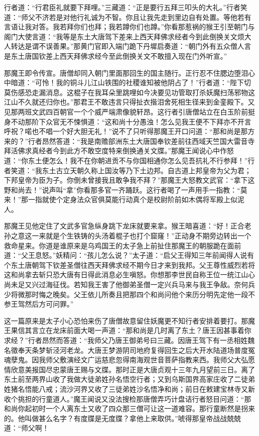 \documentclass[12pt,UTF8]{ctexbook}
\begin{document}
行者道：“行君臣礼就要下拜哩。”三藏道：“正是要行五拜三叩头的大礼。”行者笑道：“师父不济若是对他行礼诚为不智。你且让我先走到里边自有处置。等他若有言语让我对答。我若拜你们也拜；我若蹲你们也蹲。”你看那惹祸的猴王引至朝门与阁门大使言道：“我等是东土大唐驾下差来上西天拜佛求经者今到此倒换关文烦大人转达是谓不误善果。”那黄门官即入端门跪下丹墀启奏道：“朝门外有五众僧人言是东土唐国钦差上西天拜佛求经今至此倒换关文不敢擅入现在门外听宣。”

那魔王即令传宣。唐僧却同入朝门里面那回生的国主随行。正行忍不住腮边堕泪心中暗道：“可怜！我的铜斗儿江山铁围的社稷谁知被他阴占了！”行者道：“陛下切莫伤感恐走漏消息。这棍子在我耳朵里跳哩如今决要见功管取打杀妖魔扫荡邪物这江山不久就还归你也。”那君王不敢违言只得扯衣揩泪舍死相生径来到金銮殿下。又见那两班文武四百朝官一个个威严端肃像貌轩昂。这行者引唐僧站立在白玉阶前挺身不动那阶下众官无不悚惧道：“这和尚十分愚浊！怎么见我王便不下拜亦不开言呼祝？喏也不唱一个好大胆无礼！”说不了只听得那魔王开口问道：“那和尚是那方来的？”行者昂然答道：“我是南赡部洲东土大唐国奉钦差前往西域天竺国大雷音寺拜活佛求真经者今到此方不敢空度特来倒换通关文牒。”那魔王闻说心中作怒道：“你东土便怎么！我不在你朝进贡不与你国相通你怎么见吾抗礼不行参拜！”行者笑道：“我东土古立天朝久称上国汝等乃下土边邦。自古道上邦皇帝为父为君；下邦皇帝为臣为子。你倒未曾接我且敢争我不拜？”那魔王大怒教文武官：“拿下这野和尚去！”说声叫“拿”你看那多官一齐踊跃。这行者喝了一声用手一指教：“莫来！”那一指就使个定身法众官俱莫能行动真个是校尉阶前如木偶将军殿上似泥人。

那魔王见他定住了文武多官急纵身跳下龙床就要来拿。猴王暗喜道：“好！正合老孙之意这一来就是个生铁铸的头汤着棍子也打个窟窿！”正动身不期旁边转出一个救命星来。你道是谁原来是乌鸡国王的太子急上前扯住那魔王的朝服跪在面前道：“父王息怒。”妖精问：“孩儿怎么说？”太子道：“启父王得知三年前闻得人说有个东土唐朝驾下钦差圣僧往西天拜佛求经不期今日才来到我邦。父王尊性威烈若将这和尚拿去斩只恐大唐有日得此消息必生嗔怒。你想那李世民自称王位一统江山心尚未足又兴过海征伐。若知我王害了他御弟圣僧一定兴兵马来与我王争敌。奈何兵少将微那时悔之晚矣。父王依儿所奏且把那四个和尚问他个来历分明先定他一段不参王驾然后方可问罪。”

这一篇原来是太子小心恐怕来伤了唐僧故意留住妖魔更不知行者安排着要打。那魔王果信其言立在龙床前面大喝一声道：“那和尚是几时离了东土？唐王因甚事着你求经？”行者昂然而答道：“我师父乃唐王御弟号曰三藏。因唐王驾下有一丞相姓魏名徵奉天条梦斩泾河老龙。大唐王梦游阴司地府复得回生之后大开水陆道场普度冤魂孽鬼。因我师父敷演经文广运慈悲忽得南海观世音菩萨指教来西。我师父大弘愿情欣意美报国尽忠蒙唐王赐与文牒。那时正是大唐贞观十三年九月望前三日。离了东土前至两界山收了我做大徒弟姓孙名悟空行者；又到乌斯国界高家庄收了二徒弟姓猪名悟能八戒；流沙河界又收了三徒弟姓沙名悟净和尚；前日在敕建宝林寺又新收个挑担的行童道人。”魔王闻说又没法搜检那唐僧弄巧计盘诘行者怒目问道：“那和尚你起初时一个人离东土又收了四众那三僧可让这一道难容。那行童断然是拐来的。他叫做甚么名字？有度牒是无度牒？拿他上来取供。”唬得那皇帝战战兢兢道：“师父啊！
\end{document}
